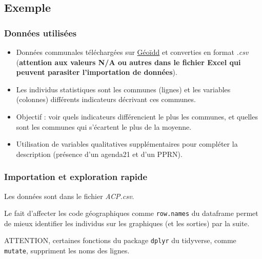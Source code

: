 \documentclass[]{book}
\providecommand{\tightlist}{%
  \setlength{\itemsep}{0pt}\setlength{\parskip}{0pt}}
\begin{document}
\hypertarget{exemple}{%
\subsection{Exemple}\label{exemple}}

\hypertarget{donnees-utilisees}{%
\subsubsection{Données utilisées}\label{donnees-utilisees}}

\begin{itemize}
\tightlist
\item
  Données communales téléchargées sur \href{http://geoidd.developpement-durable.gouv.fr/geoclip_stats_o3/index.php?profil=FR\#s=2012;v=map1;i=ocs.p_surf_c1;l=fr}{Géoïdd} et converties en format \emph{.csv} (\textbf{attention aux valeurs N/A ou autres dans le fichier Excel qui peuvent parasiter l'importation de données}).
\item
  Les individus statistiques sont les communes (lignes) et les variables (colonnes) différents indicateurs décrivant ces communes.
\item
  Objectif : voir quels indicateurs différencient le plus les communes, et quelles sont les communes qui s'écartent le plus de la moyenne.
\item
  Utilisation de variables qualitatives supplémentaires pour compléter la description (présence d'un agenda21 et d'un PPRN).
\end{itemize}

\hypertarget{importation-et-exploration-rapide}{%
\subsubsection{Importation et exploration rapide}\label{importation-et-exploration-rapide}}

Les données sont dans le fichier \emph{ACP.csv}.

Le fait d'affecter les code géographiques comme \texttt{row.names} du dataframe permet de mieux identifier les individus sur les graphiques (et les sorties) par la suite.

ATTENTION, certaines fonctions du package \texttt{dplyr} du tidyverse, comme \texttt{mutate}, suppriment les noms des lignes.
\end{document}
